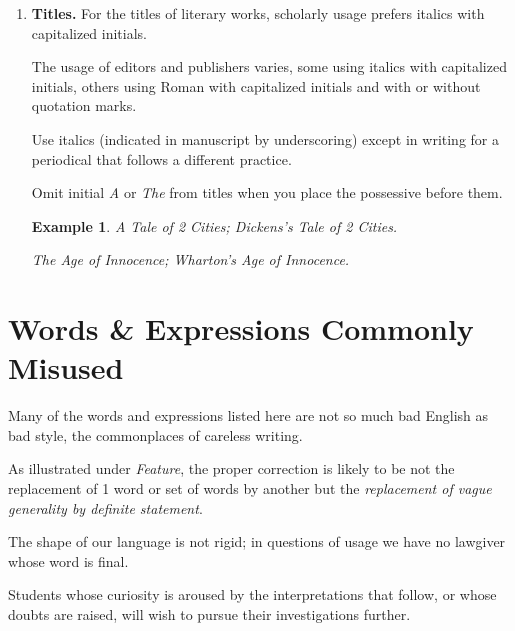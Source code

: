 \documentclass{book}
\numberwithin{equation}{section}
\newtheorem{example}{Example}[chapter]
\begin{document}
\begin{enumerate}
    The student will do well to examine the syllable division in a number of pages of any carefully printed book.
    \item \textbf{Titles.} For the titles of literary works, scholarly usage prefers italics with capitalized initials.
    
    The usage of editors and publishers varies, some using italics with capitalized initials, others using Roman with capitalized initials and with or without quotation marks.
    
    Use italics (indicated in manuscript by underscoring) except in writing for a periodical that follows a different practice.
    
    Omit initial \textit{A} or \textit{The} from titles when you place the possessive before them.
    \begin{example}
        \emph{A} Tale of 2 Cities; \emph{Dickens's} Tale of 2 Cities.
        
        The Age of Innocence; \emph{Wharton's} Age of Innocence.
    \end{example}
\end{enumerate}


\chapter{Words \& Expressions Commonly Misused}

Many of the words and expressions listed here are not so much bad English as bad style, the commonplaces of careless writing.

As illustrated under \textit{Feature}, the proper correction is likely to be not the replacement of 1 word or set of words by another but the \textit{replacement of vague generality by definite statement}.

%
The shape of our language is not rigid; in questions of usage we have no lawgiver whose word is final.

Students whose curiosity is aroused by the interpretations that follow, or whose doubts are raised, will wish to pursue their investigations further.
\end{document}

